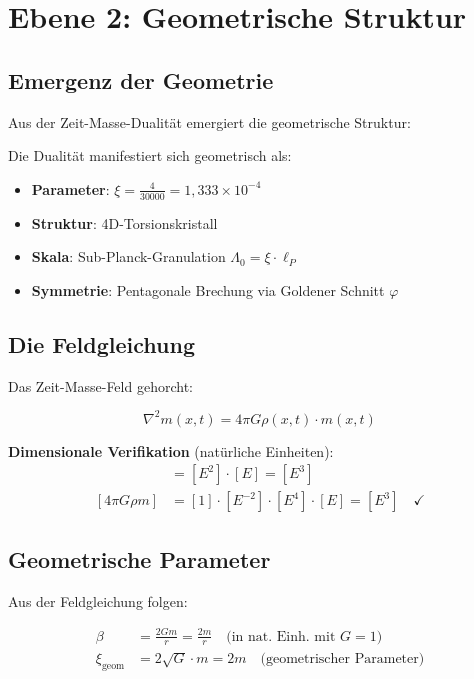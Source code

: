 \section{Ebene 2: Geometrische Struktur}

\subsection{Emergenz der Geometrie}

Aus der Zeit-Masse-Dualität emergiert die geometrische Struktur:

\begin{keyresult}
Die Dualität manifestiert sich geometrisch als:

\begin{itemize}
\item \textbf{Parameter}: $\xi = \frac{4}{30000} = 1{,}333 \times 10^{-4}$
\item \textbf{Struktur}: 4D-Torsionskristall
\item \textbf{Skala}: Sub-Planck-Granulation $\Lambda_0 = \xi \cdot \ell_P$
\item \textbf{Symmetrie}: Pentagonale Brechung via Goldener Schnitt $\varphi$
\end{itemize}
\end{keyresult}

\subsection{Die Feldgleichung}

Das Zeit-Masse-Feld gehorcht:

\begin{equation}
\boxed{\nabla^2 m(x,t) = 4\pi G \rho(x,t) \cdot m(x,t)}
\end{equation}

\textbf{Dimensionale Verifikation} (natürliche Einheiten):
\begin{align}
[\nabla^2 m] &= [E^2] \cdot [E] = [E^3] \\
[4\pi G \rho m] &= [1] \cdot [E^{-2}] \cdot [E^4] \cdot [E] = [E^3] \quad \checkmark
\end{align}

\subsection{Geometrische Parameter}

Aus der Feldgleichung folgen:

\begin{align}
\beta &= \frac{2Gm}{r} = \frac{2m}{r} \quad \text{(in nat. Einh. mit } G=1\text{)} \\
\xi_{\text{geom}} &= 2\sqrt{G} \cdot m = 2m \quad \text{(geometrischer Parameter)}
\end{align}

